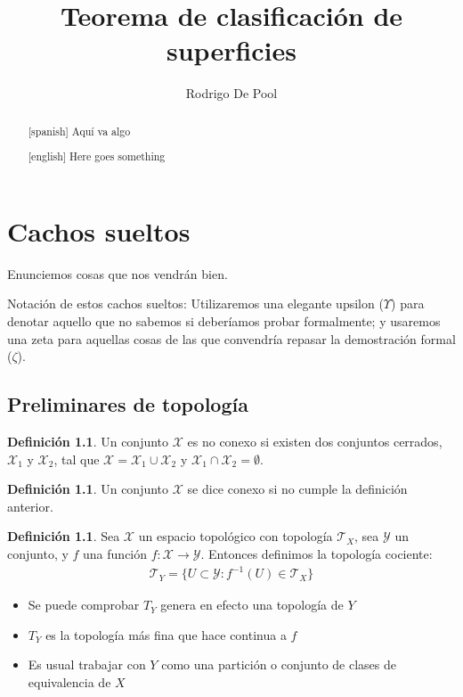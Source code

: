 \documentclass[a4paper,11pt,spanish, twoside, leqno]{tfg-uam}
\title{Teorema de clasificación de superficies}
\author{Rodrigo De Pool}
\theoremstyle{definition}
\newtheorem{defin}[teor]{Definici\'on}
\begin{document}
\begin{abstract}[spanish]
Aquí va algo
\end{abstract}
\begin{abstract}[english]
Here goes something
\end{abstract}


\mainmatter
\chapter{Cachos sueltos}



Enunciemos cosas que nos vendrán bien.

Notación de estos cachos sueltos: Utilizaremos una elegante upsilon ($\Upsilon$) para denotar aquello que no sabemos si deberíamos probar formalmente; y usaremos una zeta para aquellas cosas de las que convendría repasar la demostración formal ($\zeta$).

\section{Preliminares de topología}


\begin{defin}\label{defin:noconexo}
	Un conjunto $\mathcal{X}$ es no conexo si existen dos  conjuntos cerrados, $\mathcal{X}_1$ y $\mathcal{X}_2$, tal que $\mathcal{X}=\mathcal{X}_1\cup\mathcal{X}_2$ y $\mathcal{X}_1\cap\mathcal{X}_2=\emptyset$.
\end{defin}


\begin{defin}\label{defin:conexo}
	Un conjunto $\mathcal{X}$ se dice conexo si no cumple la definición anterior.
\end{defin}



\begin{defin}\label{defin:topologiaCociente}
	Sea $\mathcal{X}$ un espacio topológico con topología $\mathcal{T}_X$, sea $\mathcal{Y}$ un conjunto, y $f$ una función  $f:\mathcal{X}\longrightarrow\mathcal{Y}$. Entonces definimos la topología cociente:
	\begin{align*}
	\mathcal{T}_Y = \{U\subset\mathcal{Y}: f^{-1}(U)\in\mathcal{T}_X\}
	\end{align*} 
	\begin{itemize}
		\item 
		Se puede comprobar $T_Y$ genera en efecto una topología de $Y$
		\item
		$T_Y$ es la topología más fina que hace continua a $f$
		\item 
		Es usual trabajar con $Y$ como una partición o conjunto de clases de equivalencia de $X$
	\end{itemize}
\end{defin}
\end{document}
